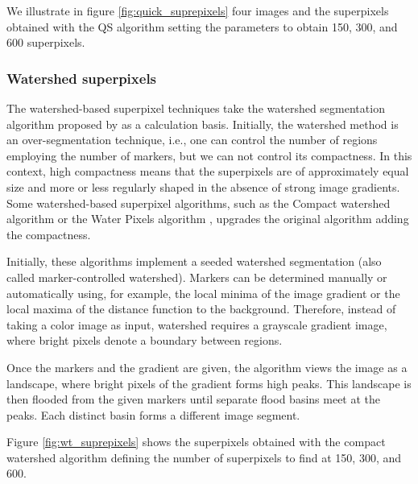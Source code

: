We illustrate in figure \ref{fig:quick_suprepixels} four images and the superpixels obtained with the QS algorithm setting the parameters to obtain 150, 300, and 600 superpixels. 


\subsubsection{Watershed superpixels}%
The watershed-based superpixel techniques take the watershed segmentation algorithm proposed by \citep{Meyer:ICIP:1992} as a calculation basis. Initially, the watershed method is an over-segmentation technique, i.e., one can control the number of regions employing the number of markers, but we can not control its compactness. In this context, high compactness means that the superpixels are of approximately equal size and more or less regularly shaped in the absence of strong image gradients. Some watershed-based superpixel algorithms, such as the Compact watershed algorithm \citep{Neubert.Protzel:ICPR:2014} or the Water Pixels algorithm \citep{Machairas.Faessel.ea:IP:2015}, upgrades the original algorithm adding the compactness. 

Initially, these algorithms implement a seeded watershed segmentation (also called marker-controlled watershed). Markers can be determined manually or automatically using, for example, the local minima of the image gradient or the local maxima of the distance function to the background. Therefore, instead of taking a color image as input, watershed requires a grayscale gradient image, where bright pixels denote a boundary between regions.

Once the markers and the gradient are given, the algorithm views the image as a landscape, where bright pixels of the gradient forms high peaks. This landscape is then flooded from the given markers until separate flood basins meet at the peaks. Each distinct basin forms a different image segment.

Figure \ref{fig:wt_suprepixels} shows the superpixels obtained with the compact watershed algorithm \citep{Neubert.Protzel:ICPR:2014} defining the number of superpixels to find at 150, 300, and 600.


